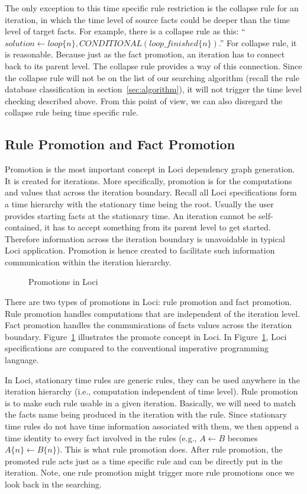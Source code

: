 \documentclass{article}
\begin{document}
The only exception to this time specific rule restriction is the
collapse rule for an iteration, in which the time level of source
facts could be deeper than the time level of target facts. For
example, there is a collapse rule as this: 
``$solution \gets loop\{n\}, CONDITIONAL(loop\_finished\{n\})$.'' For
collapse rule, it is reasonable. Because just as the fact promotion,
an iteration has to connect back to its parent level. The collapse
rule provides a way of this connection. Since the collapse rule will
not be on the list of our searching algorithm (recall the rule
database classification in section~\ref{sec:algorithm}), it will not
trigger the time level checking described above. From this point of
view, we can also disregard the collapse rule being time specific
rule. 

\subsection{Rule Promotion and Fact Promotion}
\label{sec:promote}
Promotion is the most important concept in Loci dependency graph
generation. It is created for iterations. More specifically, promotion
is for the computations and values that across the iteration
boundary. Recall all Loci specifications form a time hierarchy with
the stationary time being the root. Usually the user provides starting
facts at the stationary time. An iteration cannot be self-contained,
it has to accept something from its parent level to get
started. Therefore information across the iteration boundary is
unavoidable in typical Loci application. Promotion is hence created to
facilitate such information communication within the iteration
hierarchy. 

\begin{figure}[htbp]
  \centerline{ \epsfxsize=5in }
 \caption{Promotions in Loci}
 \label{promote}
\end{figure}

There are two types of promotions in Loci: rule promotion and fact
promotion. Rule promotion handles computations that are independent of
the iteration level. Fact promotion handles the communications of
facts values across the iteration boundary. Figure~\ref{promote}
illustrates the promote concept in Loci. In Figure~\ref{promote}, Loci
specifications are compared to the conventional imperative programming
language. 

In Loci, stationary time rules are generic rules, they can
be used anywhere in the iteration hierarchy (i.e., computation
independent of time level). Rule promotion is to make
such rule usable in a given iteration. Basically, we will need to
match the facts name being produced in the iteration with the
rule. Since stationary time rules do not have time information
associated with them, we then append a time identity to every fact
involved in the rules (e.g., $A \gets B$ becomes
$A\{n\} \gets B\{n\}$). This is what rule promotion does. After rule
promotion, the promoted rule acts just as a time specific rule and can
be directly put in the iteration. Note, one rule promotion might
trigger more rule promotions once we look back in the searching.
\end{document}
